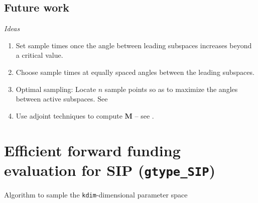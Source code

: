 \documentclass{siamltex}
\newcommand{\Mmat}{\bm{M}}
\newcommand{\xdim}{{\tt xdim}}
\newcommand{\kdim}{{\tt kdim}}
\begin{document}
\subsection{Future work}
%
%

\bigskip
\noindent\emph{Ideas}
\begin{enumerate}
  \item Set sample times once the angle between leading subspaces increases beyond a critical value.
  \item Choose sample times at equally spaced angles between the leading subspaces.
  \item Optimal sampling: Locate $n$ sample points so as to maximize the angles between active subspaces. See \cite{BG-1973}
  \item Use adjoint techniques to compute $\Mmat$ -- see \cite{EN-2006}.
\end{enumerate}


\section{Efficient forward funding evaluation for SIP ({\tt gtype\_SIP})}


Algorithm to sample the {\tt kdim}-dimensional parameter space
\end{document}
